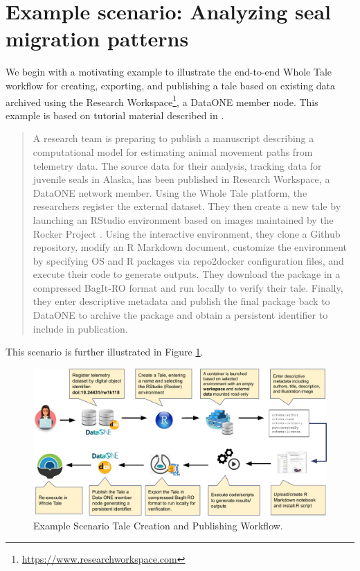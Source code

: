 \documentclass[conference]{IEEEtran}
\begin{document}
\section{Example scenario: Analyzing seal migration patterns} \label{scenario}
We begin with a motivating example to illustrate the end-to-end Whole Tale workflow for creating, exporting, and publishing a tale based on existing data archived using the Research Workspace\footnote{\url{https://www.researchworkspace.com}}, a DataONE member node. This example is based on tutorial material described in \cite{london2018}.

\begin{quote}
A research team is preparing to publish a manuscript describing a computational model for 
estimating animal movement paths from telemetry data. The source data for their analysis, 
tracking data for juvenile seals in Alaska\cite{cameron2018}, has been published in Research 
Workspace, a DataONE network member. Using the Whole Tale platform, the researchers register the 
external dataset. They then create a new tale by launching an RStudio environment based on 
images maintained by the Rocker Project \cite{boettiger2018}. Using the interactive environment, 
they clone a Github repository, modify an R Markdown document, customize the environment by 
specifying OS and R packages via repo2docker configuration files, and execute their code to 
generate outputs. They download the package in a compressed BagIt-RO format and run locally to 
verify their tale. Finally, they enter descriptive metadata and publish the final 
package back to DataONE to archive the package and obtain a persistent identifier to include in publication. 
\end{quote}

This scenario is further illustrated in Figure \ref{workflow}.


\begin{figure}
\centering
\includegraphics[scale=0.6]{images/wholetale-workflow.pdf}
\caption{Example Scenario Tale Creation and Publishing Workflow.}
\label{workflow}
\end{figure}
\end{document}
